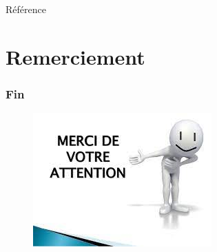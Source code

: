 \documentclass{beamer}
\begin{document}
{\small \begin{frame}{Référence}
\printbibliography
\end{frame}}
\section[Remerciement]{Remerciement}
\frame
{
\frametitle{Fin}
\begin{figure}[htbp]
\begin{center}
\includegraphics[scale=0.7]{images/thanks.jpeg}
\label{Remerciement}
\end{center}
\end{figure}
}
\end{document}

